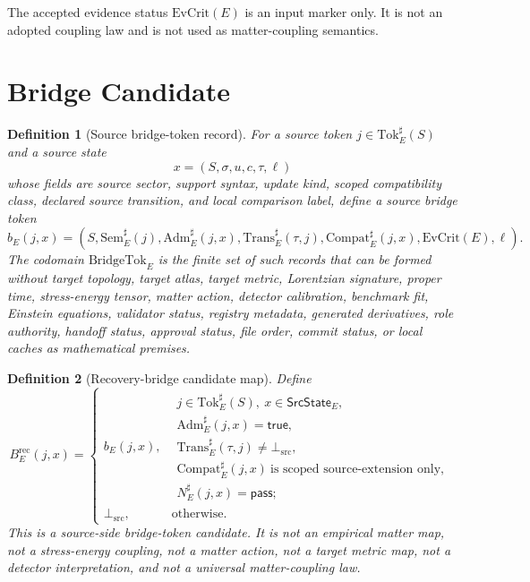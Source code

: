 \documentclass[11pt]{article}
\newcommand{\EvCrit}{\mathrm{EvCrit}}
\newcommand{\BottomSrc}{\bot_{\mathrm{src}}}
\newcommand{\Tok}{\mathrm{Tok}}
\newcommand{\Sem}{\mathrm{Sem}}
\newcommand{\Adm}{\mathrm{Adm}}
\newcommand{\Trans}{\mathrm{Trans}}
\newcommand{\Compat}{\mathrm{Compat}}
\newcommand{\BridgeTok}{\mathrm{BridgeTok}}
\newtheorem{definition}{Definition}
\begin{document}
The accepted evidence status \(\EvCrit(E)\) is an input marker only. It is not
an adopted coupling law and is not used as matter-coupling semantics.

\section{Bridge Candidate}

\begin{definition}[Source bridge-token record]
For a source token \(j\in\Tok_E^\sharp(S)\) and a source state
\[
  x=(S,\sigma,u,c,\tau,\ell)
\]
whose fields are source sector, support syntax, update kind, scoped
compatibility class, declared source transition, and local comparison label,
define a source bridge token
\[
  b_E(j,x)=
  (S,\Sem_E^\sharp(j),\Adm_E^\sharp(j,x),
  \Trans_E^\sharp(\tau,j),\Compat_E^\sharp(j,x),
  \EvCrit(E),\ell).
\]
The codomain \(\BridgeTok_E\) is the finite set of such records that can be
formed without target topology, target atlas, target metric, Lorentzian
signature, proper time, stress-energy tensor, matter action, detector
calibration, benchmark fit, Einstein equations, validator status, registry
metadata, generated derivatives, role authority, handoff status, approval
status, file order, commit status, or local caches as mathematical premises.
\end{definition}

\begin{definition}[Recovery-bridge candidate map]
Define
\[
  B_E^{\mathrm{rec}}(j,x)=
  \begin{cases}
  b_E(j,x),&
  \begin{array}{l}
  j\in\Tok_E^\sharp(S),\ x\in\mathsf{SrcState}_E,\\
  \Adm_E^\sharp(j,x)=\mathsf{true},\\
  \Trans_E^\sharp(\tau,j)\neq\BottomSrc,\\
  \Compat_E^\sharp(j,x)\ \text{is scoped source-extension only},\\
  N_E^\sharp(j,x)=\mathsf{pass};
  \end{array}\\[3ex]
  \BottomSrc,&\text{otherwise.}
  \end{cases}
\]
This is a source-side bridge-token candidate. It is not an empirical matter
map, not a stress-energy coupling, not a matter action, not a target metric
map, not a detector interpretation, and not a universal matter-coupling law.
\end{definition}
\end{document}
